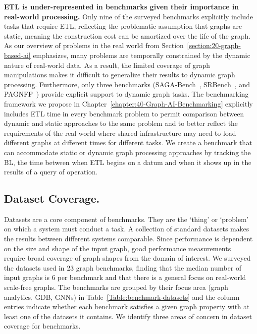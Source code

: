 \textbf{ETL is under-represented in benchmarks given their importance in real-world \gai processing.}
Only nine of the surveyed benchmarks explicitly include tasks that require ETL, reflecting the problematic assumption that graphs are static, meaning the construction cost can be amortized over the life of the graph. 
As our overview of \gai problems in the real world from Section~\ref{section:20-graph-based-ai} emphasizes, many problems are temporally constrained by the dynamic nature of real-world data.
As a result, the limited coverage of graph manipulations makes it difficult to generalize their results to dynamic graph processing. 
Furthermore, only three benchmarks (SAGA-Bench~\cite{Basak2020}, SRBench~\cite{Zhang2012}, and PAGNFF~\cite{Wu2021a}) provide explicit support to dynamic graph tasks. 
The benchmarking framework we propose in Chapter~\ref{chapter:40-Graph-AI-Benchmarking} explicitly includes \ac{ETL} time in every benchmark problem to permit comparison between dynamic and static approaches to the same problem and to better reflect the requirements of the real world where shared infrastructure may need to load different graphs at different times for different \gai tasks. 
We create a benchmark that can accommodate static or dynamic graph processing approaches by tracking the \ac{BL}, the time between when \ac{ETL} begins on a datum and when it shows up in the results of a query of operation. 



\subsection{Dataset Coverage.}
Datasets are a core component of benchmarks. 
They are the `thing' or `problem' on which a system must conduct a task. 
A collection of standard datasets makes the results between different systems comparable. 
Since \gai performance is dependent on the size and shape of the input graph, good performance measurements require broad coverage of graph shapes from the domain of interest.
We surveyed the datasets used in $23$ graph benchmarks, finding that the median number of input graphs is $6$ per benchmark and that there is a general focus on real-world scale-free graphs.
The benchmarks are grouped by their focus area (graph analytics, \ac{GDB}, \ac{GNN}s) in  Table~\ref{Table:benchmark-datasets} and the column entries indicate whether each benchmark satisfies a given graph property with at least one of the datasets it contains.
We identify three areas of concern in dataset coverage for \gai benchmarks. 

